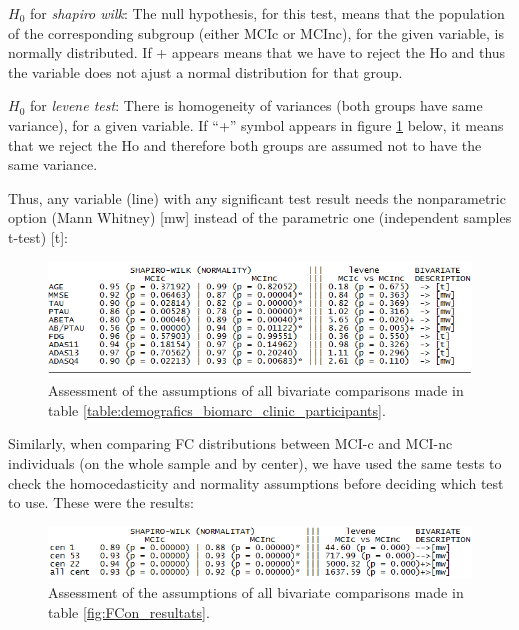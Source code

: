 		$H_{0}$ for \textit{shapiro wilk}: The null hypothesis, for this test, means that 
		the population of the corresponding subgroup (either MCIc or MCInc),
		for the given variable, is normally distributed. If + appears means that 
		we have to reject the Ho and thus the variable does not ajust a normal 
		distribution for that group.
		
		$H_{0}$ for \textit{levene test}: There is homogeneity of variances (both groups have
		same variance), for a given variable. If ``+'' symbol appears in figure \ref{fig:fig_shapiro_levene_taulaDEMOGRAFICS} below, it means that 
		we reject the Ho and therefore both groups are assumed not to 
		have the same variance.
		
		Thus, any variable (line) with any significant test result needs 
		the nonparametric option (Mann Whitney) [mw] instead of the parametric
		one (independent samples t-test) [t]:
		\FloatBarrier	
		\begin{figure}[h]
			\centering
			\includegraphics[width=1\textwidth]{fig_shapiro_levene_taulaDEMOGRAFICS.png}
			\caption{Assessment of the assumptions of all bivariate comparisons made in table \ref{table:demografics_biomarc_clinic_participants}.}
			\label{fig:fig_shapiro_levene_taulaDEMOGRAFICS}
		\end{figure}
		\FloatBarrier	

		Similarly, when comparing FC distributions between MCI-c and MCI-nc individuals (on the whole sample and by center), we have used the same tests to check the homocedasticity and normality assumptions before deciding which test to use. These were the results:
	
		\FloatBarrier
		\begin{figure}[h]
		\centering
			\includegraphics[width=1\textwidth]{fig_shapiro_levene_FCon.png}
			\caption{Assessment of the assumptions of all bivariate comparisons made in table \ref{fig:FCon_resultats}.}
			\label{fig:fig_shapiro_levene_FCon}
		\end{figure}
		\FloatBarrier
		\clearpage	
		
